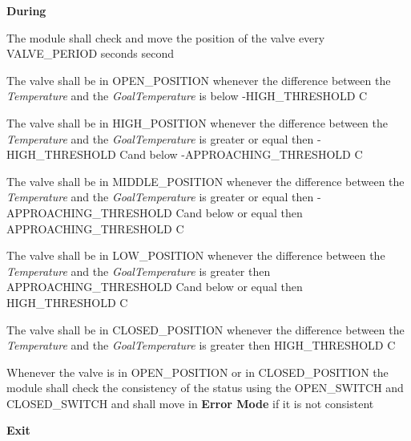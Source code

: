 \begin{req_enum}
\begin{req_enum}[label*=\arabic*.]
\begin{req_enum}[label*=\arabic*.]
							\item \textbf{During}
								\begin{req_enum}[label*=\arabic*.]
									\item The module shall check and move the position of the valve every VALVE\_PERIOD seconds  second
									\item The valve shall be in OPEN\_POSITION whenever the difference between the \textit{Temperature} and the \textit{GoalTemperature} is below -HIGH\_THRESHOLD C\degree
									\item The valve shall be in HIGH\_POSITION whenever the difference between the \textit{Temperature} and the \textit{GoalTemperature} is greater or equal then -HIGH\_THRESHOLD C\degree and below -APPROACHING\_THRESHOLD C\degree
									\item The valve shall be in MIDDLE\_POSITION whenever the difference between the \textit{Temperature} and the \textit{GoalTemperature} is greater or equal then -APPROACHING\_THRESHOLD C\degree and below or equal then APPROACHING\_THRESHOLD C\degree
									\item The valve shall be in LOW\_POSITION whenever the difference between the \textit{Temperature} and the \textit{GoalTemperature} is greater then APPROACHING\_THRESHOLD C\degree and below or equal then HIGH\_THRESHOLD C\degree
									\item The valve shall be in CLOSED\_POSITION whenever the difference between the \textit{Temperature} and the \textit{GoalTemperature} is greater then HIGH\_THRESHOLD C\degree
									\item Whenever the valve is in OPEN\_POSITION or in CLOSED\_POSITION the module shall check the consistency of the status using the OPEN\_SWITCH and CLOSED\_SWITCH and shall move in \textbf{Error Mode} if it is not consistent
								\end{req_enum}

							\item \textbf{Exit}
						\end{req_enum}


\end{req_enum}
\end{req_enum}
